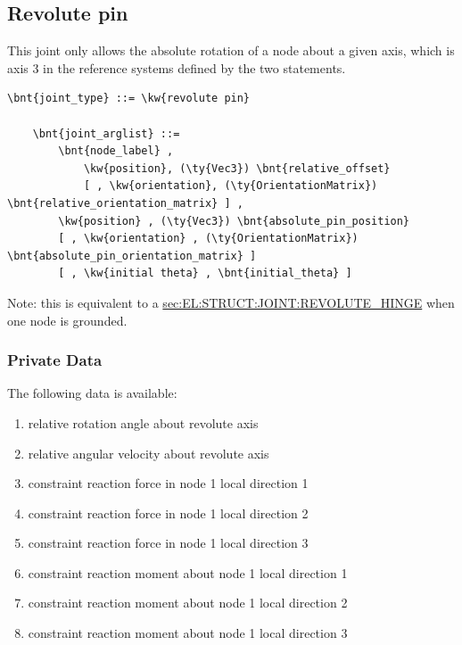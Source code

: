\subsection{Revolute pin}
\label{sec:EL:STRUCT:JOINT:REVOLUTE_PIN}
This joint only allows the absolute rotation of a node about
a given axis, which is axis 3 in the reference systems defined 
by the two  statements.
\begin{Verbatim}[commandchars=\\\{\}]
    \bnt{joint_type} ::= \kw{revolute pin}

    \bnt{joint_arglist} ::= 
        \bnt{node_label} ,
            \kw{position}, (\ty{Vec3}) \bnt{relative_offset}
            [ , \kw{orientation}, (\ty{OrientationMatrix}) \bnt{relative_orientation_matrix} ] ,
        \kw{position} , (\ty{Vec3}) \bnt{absolute_pin_position}
        [ , \kw{orientation} , (\ty{OrientationMatrix}) \bnt{absolute_pin_orientation_matrix} ]
        [ , \kw{initial theta} , \bnt{initial_theta} ]
\end{Verbatim}
Note: this is equivalent to a
\hyperref{\kw{revolute hinge}}{\kw{revolute hinge} (see Section~}{)}{sec:EL:STRUCT:JOINT:REVOLUTE_HINGE}
when one node is grounded.

\subsubsection{Private Data}
The following data is available:
\begin{enumerate}
\item {} relative rotation angle about revolute axis
\item {} relative angular velocity about revolute axis
\item {} constraint reaction force in node 1 local direction 1
\item {} constraint reaction force in node 1 local direction 2
\item {} constraint reaction force in node 1 local direction 3
\item {} constraint reaction moment about node 1 local direction 1
\item {} constraint reaction moment about node 1 local direction 2
\item {} constraint reaction moment about node 1 local direction 3
\end{enumerate}

